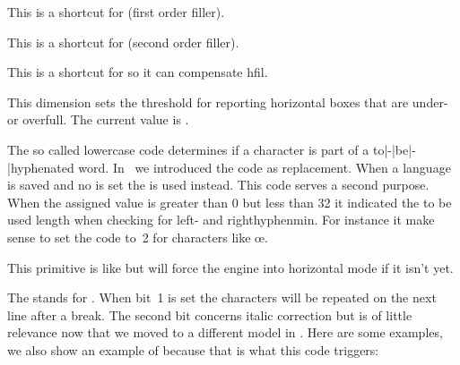 \startpacked \getbuffer \stoppacked

\stopnewprimitive

\startoldprimitive[title={\prm {hfil}}]

This is a shortcut for  (first order filler).

\stopoldprimitive

\startoldprimitive[title={\prm {hfill}}]

This is a shortcut for  (second order filler).

\stopoldprimitive

\startoldprimitive[title={\prm {hfilneg}}]

This is a shortcut for  so it can compensate \prm
{hfil}.

\stopoldprimitive

\startoldprimitive[title={\prm {hfuzz}}]

This dimension sets the threshold for reporting horizontal boxes that are under-
or overfull. The current value is \the \hfuzz.

\stopoldprimitive

\startnewprimitive[title={\prm {hjcode}}]

The so called lowercase code determines if a character is part of a
to|-|be|-|hyphenated word. In \LUATEX\ we introduced the  code as replacement. When a language is saved and no 
is set the  is used instead. This code serves a second purpose. When
the assigned value is greater than 0 but less than 32 it indicated the to be used
length when checking for left- and righthyphenmin. For instance it make sense to
set the code to~2 for characters like œ.

\stopnewprimitive

\startoldprimitive[title={\prm {hkern}}]

This primitive is like  but will force the engine into horizontal mode
if it isn't yet.

\stopoldprimitive

\startnewprimitive[title={\prm {hmcode}}]

The  stands for . When bit~1 is set the
characters will be repeated on the next line after a break. The second bit
concerns italic correction but is of little relevance now that we moved to a
different model in \CONTEXT. Here are some examples, we also show an example of
 because that is what this code triggers:

